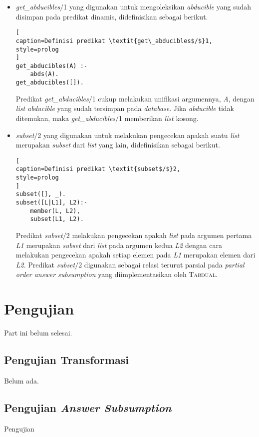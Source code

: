 \begin{itemize}
	\item \textit{get\_abducibles$/$}1 yang digunakan untuk mengoleksikan \textit{abducible} yang sudah disimpan pada predikat dinamis, didefinisikan sebagai berikut.
	\\
\begin{lstlisting}[
caption=Definisi predikat \textit{get\_abducibles$/$}1,
style=prolog
]
get_abducibles(A) :-
	abds(A).
get_abducibles([]).
\end{lstlisting}	
	
	Predikat \textit{get\_abducibles$/$}1 cukup melakukan unifikasi argumennya, \textit{A}, dengan \textit{list abducible} yang sudah tersimpan pada \textit{database}. Jika \textit{abducible} tidak ditemukan, maka \textit{get\_abducibles$/$}1 memberikan \textit{list} kosong.
	
	\item \label{subset} \textit{subset$/$}2 yang digunakan untuk melakukan pengecekan apakah suatu \textit{list} merupakan \textit{subset} dari \textit{list} yang lain, didefinisikan sebagai berikut.
	\\
	
\begin{lstlisting}[
caption=Definisi predikat \textit{subset$/$}2,
style=prolog
]
subset([], _).
subset([L|L1], L2):-
	member(L, L2),
	subset(L1, L2).
\end{lstlisting}
	
	Predikat \textit{subset$/$}2 melakukan pengecekan apakah \textit{list} pada argumen pertama \textit{L1} merupakan \textit{subset} dari \textit{list} pada argumen kedua \textit{L2} dengan cara melakukan pengecekan apakah setiap elemen pada \textit{L1} merupakan elemen dari \textit{L2}. Predikat \textit{subset$/$}2 digunakan sebagai relasi terurut parsial pada \textit{partial order answer subsumption} yang diimplementasikan oleh \textsc{Tabdual}.
	
\end{itemize}
\section{Pengujian} %

Part ini belum selesai.

\subsection{Pengujian Transformasi}
Belum ada.

\subsection{Pengujian \textit{Answer Subsumption}}

Pengujian 
